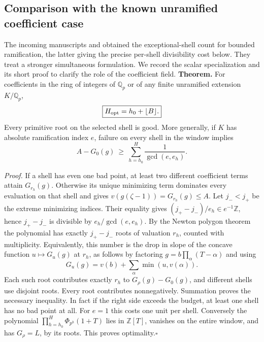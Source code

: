 \subsection{Comparison with the known unramified coefficient case}
The incoming manuscripts  and  obtained the exceptional-shell count for bounded ramification, the latter giving the precise per-shell divisibility cost below. They treat a stronger simultaneous formulation. We record the scalar specialization and its short proof to clarify the role of the coefficient field.
\noindent\textbf{Theorem.}
For coefficients in the ring of integers of $\mathbb Q_p$ or of any finite unramified extension $K/\mathbb Q_p$,
\[
                        \boxed{H_{\rm opt}=h_0+\lfloor B\rfloor.}
\]
Every primitive root on the selected shell is good. More generally, if $K$ has absolute ramification index $e$, failure on every shell in the window implies
\[
 A-G_0(g)\ \ge\ \sum_{h=h_0}^{H}\frac{1}{\gcd(e,e_h)} .
\]

\medskip\noindent\emph{Proof.}
If a shell has even one bad point, at least two different coefficient terms attain $G_{r_h}(g)$. Otherwise its unique minimizing term dominates every evaluation on that shell and gives $v(g(\zeta-1))=G_{r_h}(g)\le A$. Let $j_-<j_+$ be the extreme minimizing indices. Their equality gives $(j_+-j_-)/e_h\in e^{-1}\mathbb Z$, hence $j_+-j_-$ is divisible by $e_h/\gcd(e,e_h)$. By the Newton polygon theorem the polynomial has exactly $j_+-j_-$ roots of valuation $r_h$, counted with multiplicity. Equivalently, this number is the drop in slope of the concave function $u\mapsto G_u(g)$ at $r_h$, as follows by factoring $g=b\prod_\alpha(T-\alpha)$ and using
\[
                 G_u(g)=v(b)+\sum_\alpha\min(u,v(\alpha)).
\]
Each such root contributes exactly $r_h$ to $G_\rho(g)-G_0(g)$, and different shells use disjoint roots. Every root contributes nonnegatively. Summation proves the necessary inequality. In fact if the right side exceeds the budget, at least one shell has no bad point at all. For $e=1$ this costs one unit per shell. Conversely the polynomial $\prod_{h=h_0}^H\Phi_{p^h}(1+T)$ lies in $\mathbb Z[T]$, vanishes on the entire window, and has $G_\rho=L$, by its roots. This proves optimality.\hfill$\square$

